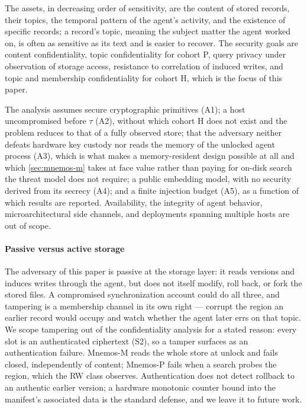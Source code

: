The assets, in decreasing order of sensitivity, are the content of stored records, their topics, the
temporal pattern of the agent's activity, and the existence of specific records; a record's topic,
meaning the subject matter the agent worked on, is often as sensitive as its text and is easier to
recover. The security goals are content confidentiality, topic confidentiality for cohort P, query
privacy under observation of storage access, resistance to correlation of induced writes, and topic
and membership confidentiality for cohort H, which is the focus of this paper.

The analysis assumes secure cryptographic primitives (A1); a host uncompromised before $\tau$ (A2),
without which cohort H does not exist and the problem reduces to that of a fully observed store;
that the adversary neither defeats hardware key custody nor reads the memory of the unlocked agent
process (A3), which is what makes a memory-resident design possible at all and which
\cref{sec:mnemos-m} takes at face value rather than paying for on-disk search the threat model does
not require; a public embedding model, with no security derived from its secrecy (A4); and a finite
injection budget (A5), as a function of which results are reported. Availability, the integrity of
agent behavior, microarchitectural side channels, and deployments spanning multiple hosts are out of
scope.

\paragraph{Passive versus active storage}
The adversary of this paper is passive at the storage layer: it reads versions and induces writes
through the agent, but does not itself modify, roll back, or fork the stored files. A compromised
synchronization account could do all three, and tampering is a membership channel in its own right
--- corrupt the region an earlier record would occupy and watch whether the agent later errs on that
topic. We scope tampering out of the confidentiality analysis for a stated reason: every slot is an
authenticated ciphertext (S2), so a tamper surfaces as an authentication failure. Mnemos-M reads the
whole store at unlock and fails closed, independently of content; Mnemos-P fails when a search probes
the region, which the RW class observes. Authentication does not detect rollback to an authentic
earlier version; a hardware monotonic counter bound into the manifest's associated data is the
standard defense, and we leave it to future work.
